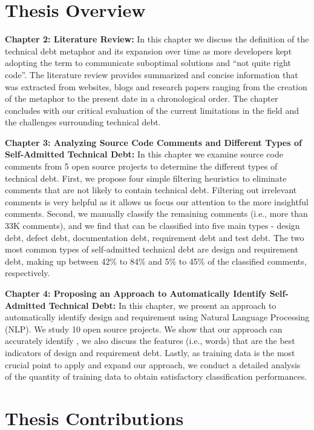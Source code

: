 \section{Thesis Overview}


\noindent\textbf{Chapter 2: Literature Review:} In this chapter we discuss the definition of the technical debt metaphor and its expansion over time as more developers kept adopting the term to communicate suboptimal solutions and ``not quite right code''. The literature review provides summarized and concise information that was extracted from websites, blogs and research papers ranging from the creation of the metaphor to the present date in a chronological order. The chapter concludes with our critical evaluation of the current limitations in the field and the challenges surrounding technical debt.

\vspace{1mm}
\noindent\textbf{Chapter 3: Analyzing Source Code Comments and Different Types of Self-Admitted Technical Debt:} In this chapter we examine source code comments from 5 open source projects to determine the different types of technical debt. First, we propose four simple filtering heuristics to eliminate comments that are not likely to contain technical debt. Filtering out irrelevant comments is very helpful as it allows us focus our attention to the more insightful comments. Second, we manually classify the remaining comments (i.e., more than 33K comments), and we find that \SATD can be classified into five main types - design debt, defect debt, documentation debt, requirement debt and test debt. The two most common types of self-admitted technical debt are design and requirement debt, making up between 42\% to 84\% and 5\% to 45\% of the classified comments, respectively.

\vspace{1mm}
\noindent\textbf{Chapter 4: Proposing an Approach to Automatically Identify Self-Admitted Technical Debt:} In this chapter, we present an approach to automatically identify design and requirement \SATD using Natural Language Processing (NLP). We study 10 open source projects. We show that our approach can accurately identify \SATD, we also discuss the features (i.e., words) that are the best indicators of design and requirement debt. Lastly, as training data is the most crucial point to apply and expand our approach, we conduct a detailed analysis of the quantity of training data to obtain satisfactory classification performances.

\section{Thesis Contributions}

